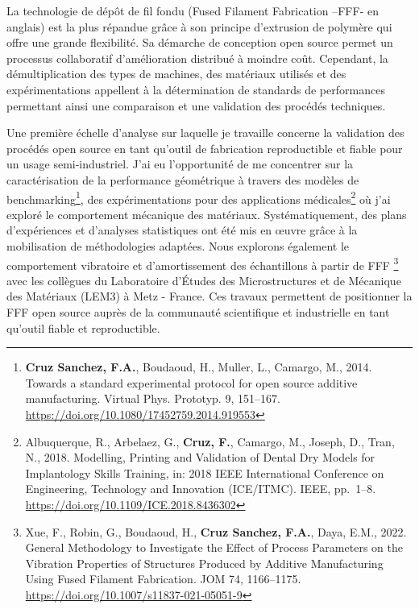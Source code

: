 \documentclass[
  11pt,
]{article}
\begin{document}
La technologie de dépôt de fil fondu (Fused Filament Fabrication --FFF-
en anglais) est la plus répandue grâce à son principe d'extrusion de
polymère qui offre une grande flexibilité. Sa démarche de conception
open source permet un processus collaboratif d'amélioration distribué à
moindre coût. Cependant, la démultiplication des types de machines, des
matériaux utilisés et des expérimentations appellent à la détermination
de standards de performances permettant ainsi une comparaison et une
validation des procédés techniques.

Une première échelle d'analyse sur laquelle je travaille concerne la
validation des procédés open source en tant qu'outil de fabrication
reproductible et fiable pour un usage semi-industriel. J'ai eu
l'opportunité de me concentrer sur la caractérisation de la performance
géométrique à travers des modèles de benchmarking\footnote{\textbf{Cruz
  Sanchez, F.A.}, Boudaoud, H., Muller, L., Camargo, M., 2014. Towards a
  standard experimental protocol for open source additive manufacturing.
  Virtual Phys. Prototyp. 9, 151--167.
  \url{https://doi.org/10.1080/17452759.2014.919553}}, des
expérimentations pour des applications médicales\footnote{Albuquerque,
  R., Arbelaez, G., \textbf{Cruz, F.}, Camargo, M., Joseph, D., Tran,
  N., 2018. Modelling, Printing and Validation of Dental Dry Models for
  Implantology Skills Training, in: 2018 IEEE International Conference
  on Engineering, Technology and Innovation (ICE/ITMC). IEEE, pp.~1--8.
  \url{https://doi.org/10.1109/ICE.2018.8436302}} où j'ai exploré le
comportement mécanique des matériaux. Systématiquement, des plans
d'expériences et d'analyses statistiques ont été mis en œuvre grâce à la
mobilisation de méthodologies adaptées. Nous explorons également le
comportement vibratoire et d'amortissement des échantillons à partir de
FFF \footnote{Xue, F., Robin, G., Boudaoud, H., \textbf{Cruz Sanchez,
  F.A.}, Daya, E.M., 2022. General Methodology to Investigate the Effect
  of Process Parameters on the Vibration Properties of Structures
  Produced by Additive Manufacturing Using Fused Filament Fabrication.
  JOM 74, 1166--1175. \url{https://doi.org/10.1007/s11837-021-05051-9}}
avec les collègues du Laboratoire d'Études des Microstructures et de
Mécanique des Matériaux (LEM3) à Metz - France. Ces travaux permettent
de positionner la FFF open source auprès de la communauté scientifique
et industrielle en tant qu'outil fiable et reproductible.
\end{document}
